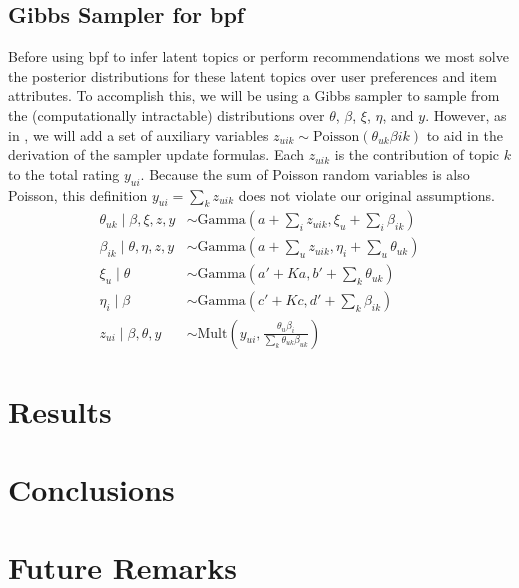 \documentclass{article} %
\begin{document}
\subsection{Gibbs Sampler for \acrlong{bpf}}
Before using \gls{bpf} to infer latent topics or perform recommendations we most solve the posterior distributions for these latent topics over user preferences and item attributes. To accomplish this, we will be using a Gibbs sampler to sample from the (computationally intractable) distributions over $\theta$, $\beta$, $\xi$, $\eta$, and $y$. However, as in \cite{gopalan2013scalable}, we will add a set of auxiliary variables $z_{uik} \sim \mathrm{Poisson} \left ( \theta_{uk} \beta{ik} \right )$ to aid in the derivation of the sampler update formulas. Each $z_{uik}$ is the contribution of topic $k$ to the total rating $y_{ui}$. Because the sum of Poisson random variables is also Poisson, this definition $y_{ui} = \sum_k z_{uik}$ does not violate our original assumptions.
\begin{align*}
	\theta_{uk} \mid \beta, \xi, z, y &\sim \mathrm{Gamma}\left(a + \sum_i z_{uik}, \xi_u + \sum_i \beta_{ik} \right) \\
	\beta_{ik} \mid \theta, \eta, z, y &\sim \mathrm{Gamma}\left (a + \sum_u z_{uik}, \eta_i + \sum_u \theta_{uk} \right ) \\
	\xi_u \mid \theta &\sim \mathrm{Gamma}\left (a' + Ka, b' + \sum_k \theta_{uk} \right ) \\
	\eta_i \mid \beta &\sim \mathrm{Gamma} \left (c' + Kc, d' + \sum_k \beta_{ik} \right ) \\
	z_{ui} \mid \beta, \theta, y &\sim \mathrm{Mult} \left (y_{ui}, \frac{\theta_u \beta_i}{\sum_k \theta_{uk} \beta_{uk}} \right )
\end{align*}
\section{Results}

\section{Conclusions}

\section{Future Remarks}



\end{document}
